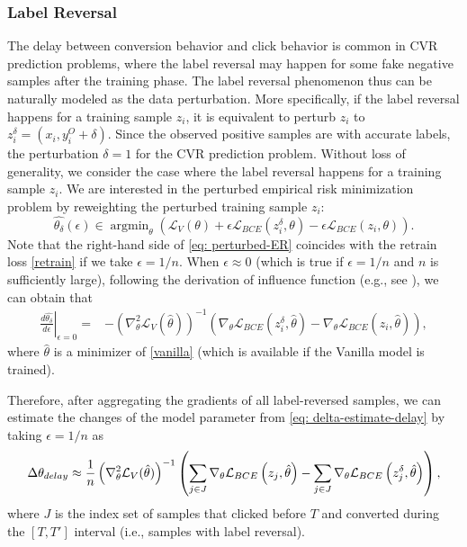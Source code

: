 \subsubsection{Label Reversal}
The delay between conversion behavior and click behavior is common in CVR prediction problems, where the label reversal may happen for some fake negative samples after the training phase. The label reversal phenomenon thus can be naturally modeled as the data perturbation. More specifically,  if the label reversal happens for a training sample $z_i$, it is equivalent to perturb $z_i$ to $z_i^\delta = (x_i,y_i^{O}+\delta)$. Since the observed positive samples are with accurate labels, the perturbation $\delta = 1$ for the CVR prediction problem. Without loss of generality, we consider the case where the label reversal happens for a training sample $z_i$. We are interested in the perturbed empirical risk minimization problem by reweighting the perturbed training sample $z_i$:
\begin{equation}
\label{eq: perturbed-ER}
\widehat{\theta_\delta}(\epsilon) \in \mathop{\arg\min}_{\theta} \left( \mathcal{L}_{{V}}(\theta)+\epsilon \mathcal{L}_{{BCE}}\left(z_i^{\delta},\theta\right)-\epsilon  \mathcal{L}_{{BCE}}\left(z_i, \theta\right) \right).
\end{equation}
Note that the right-hand side of \eqref{eq: perturbed-ER} coincides with the retrain loss \eqref{retrain} if we take $\epsilon = 1/n$. When $\epsilon \approx 0$ (which is true if $\epsilon = 1/n$ and $n$ is sufficiently large), following the derivation of influence function (e.g., see \cite{koh2017understanding}), we can obtain that  
\begin{equation}
\label{eq: delta-estimate-delay}
\begin{aligned}
\left.\frac{d \widehat{\theta_\delta}}{d \epsilon}\right|_{\epsilon=0} =
& -\left(\nabla_\theta^2 \mathcal{L}_{V} (\hat{\theta}) \right)^{-1}\left(\nabla_\theta \mathcal{L}_{{BCE}}\left(z^\delta_i, \hat{\theta}\right)-\nabla_\theta \mathcal{L}_{{BCE}}(z_i, \hat{\theta})\right),
\end{aligned}
\end{equation}
where $\hat{\theta}$ is a minimizer of \eqref{vanilla} (which is available if the Vanilla model is trained).

Therefore, after aggregating the gradients of all label-reversed samples, we can estimate the changes of the model parameter from \eqref{eq: delta-estimate-delay} by taking $\epsilon = 1/n$ as
\begin{equation}
\small
\label{eqc}
\Delta \theta_{delay} \approx \frac{1}{n}\left(\nabla_\theta^2 \mathcal{L}_{{V}}(\hat{\theta})\right)^{-1}\left(\sum_{j\in J} \nabla_\theta \mathcal{L}_{{BCE}}\left(z_j, \hat{\theta}\right)-\sum_{j \in J} \nabla_\theta \mathcal{L}_{{BCE}}\left(z_j^\delta, \hat{\theta}\right)\right),
\end{equation}
where $J$ is the index set of samples that clicked before $T$ and converted during the $[T, T']$ interval (i.e., samples with label reversal). 

